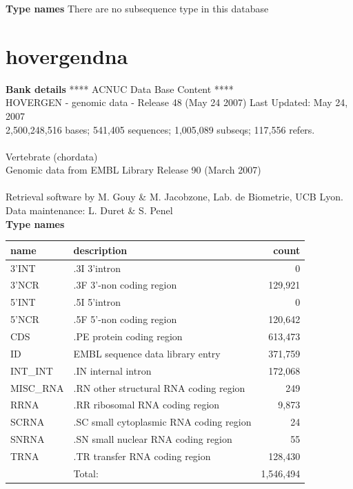 \documentclass{article}
\begin{document}
\begin{Schunk}
\textbf{Type names}
There are no subsequence type in this database
\section{ hovergendna }
\textbf{Bank details}
               ****     ACNUC Data Base Content      ****                      \\
 HOVERGEN - genomic data - Release 48 (May 24 2007) Last Updated: May 24, 2007\\
2,500,248,516 bases; 541,405 sequences; 1,005,089 subseqs; 117,556 refers.\\
                                                                               \\
                       Vertebrate (chordata)\\
    Genomic data from EMBL Library Release 90 (March 2007)\\
\\
Retrieval software by M. Gouy \& M. Jacobzone, Lab. de Biometrie, UCB Lyon.\\
Data maintenance: L. Duret \& S. Penel\\


\textbf{Type names}
\noindent\begin{tabular}{llr}
\hline \hline
name & description & count \\
\hline
3'INT  &  .3I 3'intron  &  0 \\
3'NCR  &  .3F  3'-non coding region  &  129,921 \\
5'INT  &  .5I 5'intron  &  0 \\
5'NCR  &  .5F  5'-non coding region  &  120,642 \\
CDS  &  .PE protein coding region  &  613,473 \\
ID  &  EMBL sequence data library entry  &  371,759 \\
INT\_INT  &  .IN  internal intron  &  172,068 \\
MISC\_RNA  &  .RN other structural RNA coding region  &  249 \\
RRNA  &  .RR ribosomal RNA coding region  &  9,873 \\
SCRNA  &  .SC small cytoplasmic RNA coding region  &  24 \\
SNRNA  &  .SN small nuclear RNA coding region  &  55 \\
TRNA  &  .TR transfer RNA coding region  &  128,430 \\
\hline
 & Total: & 1,546,494 \\
\hline \hline
\end{tabular}


\end{Schunk}
\end{document}
